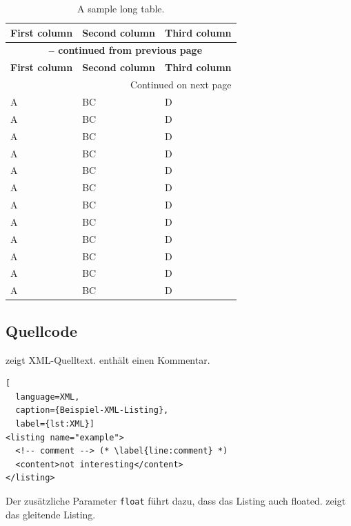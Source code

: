 \begin{ltgexample}
\begin{longtable}{lll}
  \caption{A sample long table.}\label{tab:long} \\
  \toprule
  \textbf{First column} & \textbf{Second column} & \textbf{Third column} \\
  \midrule
  \endfirsthead

  \multicolumn{3}{c}{{\bfseries \tablename\ \thetable{} -- continued from previous page}} \\
  \toprule
  \textbf{First column} & \textbf{Second column} & \textbf{Third column} \\
  \midrule
  \endhead

  \midrule
  \multicolumn{3}{r}{{Continued on next page}} \\
  \endfoot

  \bottomrule
  \endlastfoot

  A & BC & D \\
  A & BC & D \\
  A & BC & D \\
  A & BC & D \\
  A & BC & D \\
  A & BC & D \\
  A & BC & D \\
  A & BC & D \\
  A & BC & D \\
  A & BC & D \\
  A & BC & D \\
  A & BC & D \\
\end{longtable}
\end{ltgexample}

\subsection{Quellcode}

\begin{ltgexample}
 zeigt XML-Quelltext.
 enthält einen Kommentar.

\begin{lstlisting}[
  language=XML,
  caption={Beispiel-XML-Listing},
  label={lst:XML}]
<listing name="example">
  <!-- comment --> (* \label{line:comment} *)
  <content>not interesting</content>
</listing>
\end{lstlisting}
\end{ltgexample}

Der zusätzliche Parameter \verb+float+ führt dazu, dass das Listing auch floated.
 zeigt das gleitende Listing.

